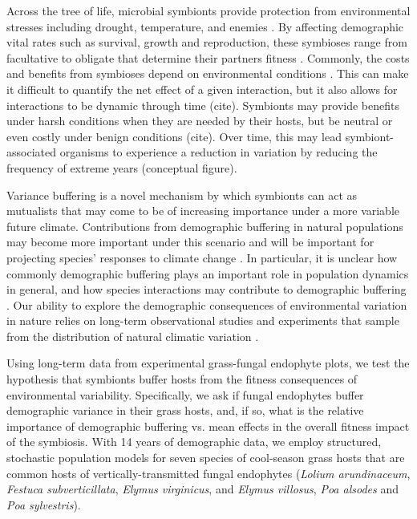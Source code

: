 \documentclass[9pt,twocolumn,twoside,lineno]{pnas-new}
\begin{document}
Across the tree of life, microbial symbionts provide protection from environmental stresses including drought, temperature, and enemies \cite{kivlin2013fungal}. By affecting demographic vital rates such as survival, growth and reproduction, these symbioses range from facultative to obligate that determine their partners fitness \cite{}. Commonly, the costs and benefits from symbioses depend on environmental conditions \cite{chamberlain2014context}. This can make it difficult to quantify the net effect of a given interaction, but it also allows for interactions to be dynamic through time (cite). Symbionts may provide benefits under harsh conditions when they are needed by their hosts, but be neutral or even costly under benign conditions (cite). Over time, this may lead symbiont-associated organisms to experience a reduction in variation by reducing the frequency of extreme years (conceptual figure).

Variance buffering is a novel mechanism by which symbionts can act as mutualists that may come to be of increasing importance under a more variable future climate. Contributions from demographic buffering in natural populations may become more important under this scenario and will be important for projecting species' responses to climate change \cite{doak2005correctly}. In particular, it is unclear how commonly demographic buffering plays an important role in population dynamics in general, and how species interactions may contribute to demographic buffering \cite{hilde_demographic_2020}. Our ability to explore the demographic consequences of environmental variation in nature relies on long-term observational studies and experiments that sample from the distribution of natural climatic variation \cite{}.

Using long-term data from experimental grass-fungal endophyte plots, we test the hypothesis that symbionts buffer hosts from the fitness consequences of environmental variability. Specifically, we ask if fungal endophytes buffer demographic variance in their grass hosts, and, if so, what is the relative importance of demographic buffering vs. mean effects in the overall fitness impact of the symbiosis.  With 14 years of demographic data, we employ structured, stochastic population models for seven species of cool-season grass hosts that are common hosts of vertically-transmitted fungal endophytes (\textit{Lolium arundinaceum}, \textit{Festuca subverticillata}, \textit{Elymus virginicus}, and \textit{Elymus villosus}, \textit{Poa alsodes} and \textit{Poa sylvestris}).
\end{document}

